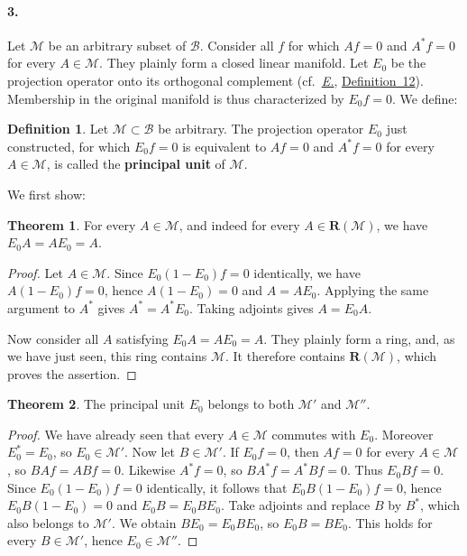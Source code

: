 \documentclass[
  paper=b5,
  twoside=true,
  fontsize=13pt,
  headings=normal,
  bookmarkpackage=false
]{scrartcl}
\theoremstyle{definition}
\newtheorem{theorem}{Theorem}
\newtheorem{definition}{Definition}
\newcommand{\Eref}{\hyperref[fn:E-paper]{\emph{E.}}}
\newcommand{\ErefText}[1]{\href{https://doi.org/10.1007/BF01782338}{#1}}
\newcommand{\GeneratedRing}{\boldsymbol{R}}
\begin{document}
\paragraph*{3.}\label{sec:ii-3}
Let \(\mathcal M\) be an arbitrary subset of \(\mathcal B\). Consider
all \(f\) for which \(Af=0\) and \(A^*f=0\) for every \(A\in\mathcal M\).
They plainly form a closed linear manifold. Let \(E_0\) be the projection
operator onto its orthogonal complement (cf.\ \Eref, \ErefText{Definition~12}).
Membership in the original manifold is thus characterized by \(E_0f=0\).
We define:

\begin{definition}\label{def:principal-unit}
Let \(\mathcal M\subset\mathcal B\) be arbitrary. The projection
operator \(E_0\) just constructed, for which \(E_0f=0\) is equivalent to
\(Af=0\) and \(A^*f=0\) for every \(A\in\mathcal M\), is called the
\textbf{principal unit} of \(\mathcal M\).
\end{definition}

We first show:

\begin{theorem}\label{thm:3}
For every \(A\in\mathcal M\), and indeed for every
\(A\in \GeneratedRing (\mathcal M)\), we have \(E_0A=AE_0=A\).
\end{theorem}

\begin{proof}
Let \(A\in\mathcal M\). Since \(E_0(1-E_0)f=0\) identically,
we have \(A(1-E_0)f=0\), hence \(A(1-E_0)=0\) and \(A=AE_0\).
Applying the same argument to \(A^*\) gives \(A^*=A^*E_0\). Taking
adjoints gives \(A=E_0A\).

Now consider all \(A\) satisfying \(E_0A=AE_0=A\).  They plainly form a
ring, and, as we have just seen, this ring contains \(\mathcal M\).
It therefore contains \(\GeneratedRing (\mathcal M)\), which proves the assertion.
\end{proof}

\begin{theorem}\label{thm:4}
The principal unit \(E_0\) belongs to both \(\mathcal M'\) and
\(\mathcal M''\).
\end{theorem}

\begin{proof}
We have already seen that every \(A\in\mathcal M\) commutes with \(E_0\).
Moreover \(E_0^*=E_0\), so \(E_0\in\mathcal M'\). Now let
\(B\in\mathcal M'\). If \(E_0f=0\), then \(Af=0\) for every
\(A\in\mathcal M\), so \(BAf=ABf=0\). Likewise \(A^*f=0\), so
\(BA^*f=A^*Bf=0\). Thus \(E_0Bf=0\). Since \(E_0(1-E_0)f=0\)
identically, it follows that \(E_0B(1-E_0)f=0\), hence
\(E_0B(1-E_0)=0\) and \(E_0B=E_0BE_0\). Take adjoints and replace
\(B\) by \(B^*\), which also belongs to \(\mathcal M'\). We obtain
\(BE_0=E_0BE_0\), so \(E_0B=BE_0\). This holds for every
\(B\in\mathcal M'\), hence \(E_0\in\mathcal M''\).
\end{proof}
\end{document}
